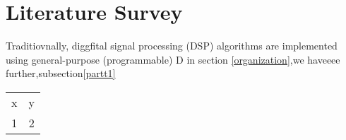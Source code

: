 \chapter{Literature Survey}

Traditiovnally, diggfital signal processing (DSP) algorithms are
implemented using general-purpose (programmable) D
in section \ref{organization},we haveeee further,subsection\ref{partt1}
\begin{tabular}{|c|c|}
                                                                         \hline
                                                                         x & y \\
                                                                         1 & 2 \\
                                                                         \hline
                                                                       \end{tabular}
